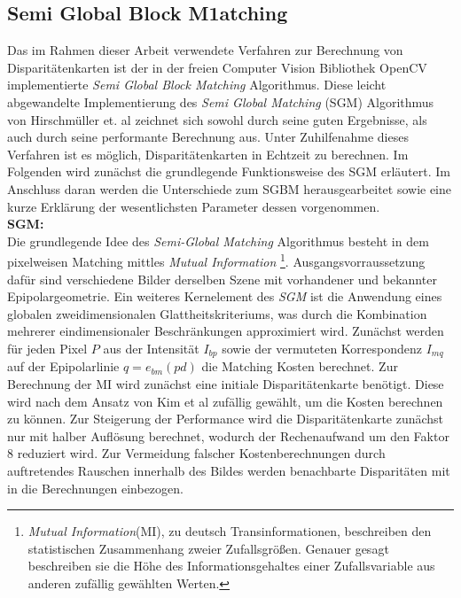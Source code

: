 \subsection{Semi Global Block M1atching}
\label{subsec:stereo_matching_sgbm}
Das im Rahmen dieser Arbeit verwendete Verfahren zur Berechnung von Disparitätenkarten ist der in der freien Computer Vision Bibliothek OpenCV \cite{opencv} implementierte \emph{Semi Global Block Matching} Algorithmus. Diese leicht abgewandelte Implementierung des \emph{Semi Global Matching} (SGM) Algorithmus von Hirschmüller et. al \cite{hirschmuller2005sgm} zeichnet sich sowohl durch seine guten Ergebnisse, als auch durch seine performante Berechnung aus. Unter Zuhilfenahme dieses Verfahren ist es möglich, Disparitätenkarten in Echtzeit zu berechnen. Im Folgenden wird zunächst die grundlegende Funktionsweise des SGM erläutert. Im Anschluss daran werden die Unterschiede zum SGBM herausgearbeitet sowie eine kurze Erklärung der wesentlichsten Parameter dessen vorgenommen.\\

\noindent
\textbf{SGM:} \\
Die grundlegende Idee des \emph{Semi-Global Matching} Algorithmus besteht in dem pixelweisen Matching mittles \emph{Mutual Information} \footnote{\emph{Mutual Information}(MI), zu deutsch Transinformationen, beschreiben den statistischen Zusammenhang zweier Zufallsgrößen. Genauer gesagt beschreiben sie die Höhe des Informationsgehaltes einer Zufallsvariable aus anderen zufällig gewählten Werten.}. Ausgangsvorraussetzung dafür sind verschiedene Bilder derselben Szene mit vorhandener und bekannter Epipolargeometrie. Ein weiteres Kernelement des \emph{SGM} ist die Anwendung eines globalen zweidimensionalen Glattheitskriteriums,
 was durch die Kombination mehrerer eindimensionaler Beschränkungen approximiert wird. Zunächst werden für jeden Pixel $P$ aus der Intensität $I_{bp}$ sowie der vermuteten Korrespondenz $I_{mq}$ auf der Epipolarlinie $q=e_{bm}(pd)$ die Matching Kosten berechnet. Zur Berechnung der MI wird zunächst eine initiale Disparitätenkarte benötigt. Diese wird nach dem Ansatz von Kim et al \cite{lee2012intelligent} zufällig gewählt, um die Kosten berechnen zu können. Zur Steigerung der Performance wird die Disparitätenkarte zunächst nur mit halber Auflösung berechnet, wodurch der Rechenaufwand um den Faktor $8$ reduziert wird. Zur Vermeidung falscher Kostenberechnungen durch auftretendes Rauschen innerhalb des Bildes werden benachbarte Disparitäten mit in die Berechnungen einbezogen.\\

